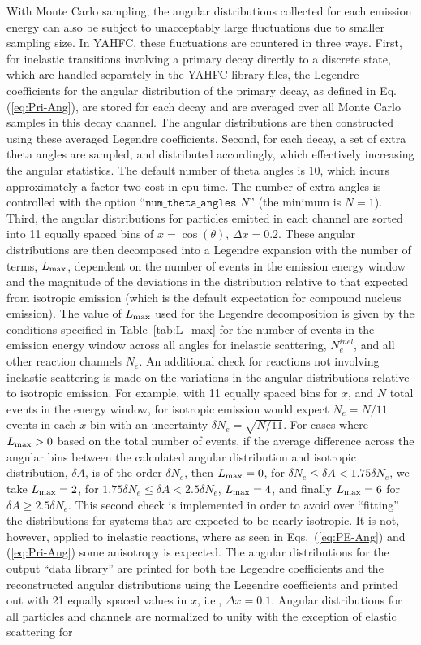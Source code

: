 \documentclass[
10pt,
showpacs,preprintnumbers,footinbib,
amsfonts,amsmath,amssymb,
aps,
prc,twocolumn,groupedaddress,superscriptaddress,
showkeys,
nofootinbib
]{revtex4-1}
\begin{document}
With Monte Carlo sampling, the angular distributions collected for each emission energy can also be subject to unacceptably large fluctuations due to smaller sampling size. In YAHFC, these fluctuations are countered in three ways. First, for inelastic transitions involving a primary decay directly to a discrete state, which are handled separately in the YAHFC library files, the Legendre coefficients for the angular distribution of the primary decay, as defined in Eq. (\ref{eq:Pri-Ang}), are stored for each decay and are averaged over all Monte Carlo samples in this decay channel. The angular distributions are then constructed using these averaged Legendre coefficients.  Second, for each decay, a set of extra theta angles are sampled, and distributed accordingly, which effectively increasing the angular statistics. The default number of theta angles is 10, which incurs approximately a factor two cost in cpu time. The number of extra angles is controlled with the option ``${\texttt{num\_theta\_angles }} N$'' (the minimum is $N = 1$). Third, the angular distributions for particles emitted in each channel are sorted into 11 equally spaced bins of $x=\cos(\theta)$, $\Delta x = 0.2$. These angular distributions are then decomposed into a Legendre expansion with the number of terms, $L_{\rm max}$, dependent on the number of events in the emission energy window and the magnitude of the deviations in the distribution relative to that expected from isotropic emission (which is the default expectation for compound nucleus emission). The value of $L_{\rm max}$ used for the Legendre decomposition is given by the conditions specified in Table~\ref{tab:L_max} for the number of events in the emission energy window across all angles for inelastic scattering, $N_e^{inel}$, and all other reaction channels $N_e$. An additional check for reactions not involving inelastic scattering is made on the variations in the angular distributions relative to isotropic emission. For example, with 11 equally spaced bins for $x$, and $N$ total events in the energy window, for isotropic emission would expect $N_e=N/11$ events in each $x$-bin with an uncertainty $\delta N_e = \sqrt{N/11}$. For cases where $L_{\rm max} > 0$ based on the total number of events, if the average difference across the angular bins between the calculated angular distribution and isotropic distribution, $\delta A$, is of the order $\delta N_e$, then $L_{\rm max} = 0$, for $\delta N_e \le \delta A < 1.75 \delta N_e$, we take $L_{\rm max} = 2$, for $1.75\delta N_e \le \delta A < 2.5 \delta N_e$, $L_{\rm max} = 4$, and finally $L_{\rm max} = 6$ for $ \delta A \ge 2.5 \delta N_e$. This second check is implemented in order to avoid over ``fitting'' the distributions for systems that are expected to be nearly isotropic. It is not, however, applied to inelastic reactions, where as seen in Eqs.~(\ref{eq:PE-Ang}) and (\ref{eq:Pri-Ang}) some anisotropy is expected.  The angular distributions for the output ``data library'' are printed for both the Legendre coefficients and the reconstructed angular distributions using the Legendre coefficients and printed out with 21 equally spaced values in $x$, i.e., $\Delta x = 0.1$. Angular distributions for all particles and channels are normalized to unity with the exception of elastic scattering for 
\end{document}
